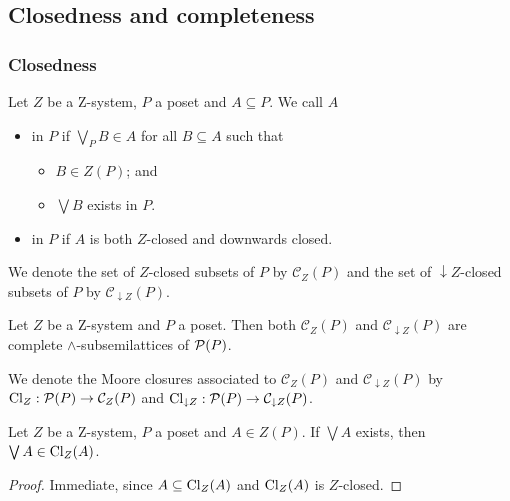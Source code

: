 \subsection{Closedness and completeness}
\subsubsection{Closedness}
\begin{definition}
Let $Z$ be a $\mathrm{Z}$-system, $P$ a poset and $A\subseteq P$. We call $A$
\begin{itemize}
\item {} in $P$ if $\bigvee_P B \in A$ for all $B\subseteq A$ such that
\begin{itemize}
\item $B\in Z(P)$; and
\item $\bigvee B$ exists in $P$.
\end{itemize}
\item {} in $P$ if $A$ is both $Z$-closed and downwards closed.
\end{itemize}
We denote the set of $Z$-closed subsets of $P$ by $\mathcal{C}_Z(P)$ and the set of ${\downarrow}Z$-closed subsets of $P$ by $\mathcal{C}_{\downarrow Z}(P)$.
\end{definition}

\begin{lemma}
Let $Z$ be a $\mathrm{Z}$-system and $P$ a poset. Then both $\mathcal{C}_Z(P)$ and $\mathcal{C}_{\downarrow Z}(P)$ are complete $\wedge$-subsemilattices of $\operatorname{\mathcal{P}}(P)$.
\end{lemma}

\begin{definition}
We denote the Moore closures associated to $\mathcal{C}_Z(P)$ and $\mathcal{C}_{\downarrow Z}(P)$ by $\operatorname{Cl}_Z: \operatorname{\mathcal{P}}(P)\to \mathcal{C}_Z(P)$ and $\operatorname{Cl}_{\downarrow Z}: \operatorname{\mathcal{P}}(P)\to \mathcal{C}_{\downarrow Z}(P)$.
\end{definition}

\begin{lemma} \label{ZclosureContainsJoin}
Let $Z$ be a $\mathrm{Z}$-system, $P$ a poset and $A\in Z(P)$. If $\bigvee A$ exists, then $\bigvee A \in \operatorname{Cl}_{Z}(A)$.
\end{lemma}
\begin{proof}
Immediate, since $A \subseteq \operatorname{Cl}_{Z}(A)$ and $\operatorname{Cl}_{Z}(A)$ is $Z$-closed.
\end{proof}

